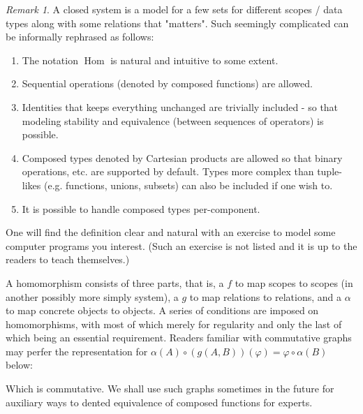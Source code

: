 \documentclass{book}
\theoremstyle{definition}\newtheorem{mechanism}{Mechanism}
\theoremstyle{remark}\newtheorem*{remark}{Remark}
\DeclareMathOperator*{\Hom}{Hom}
\begin{document}
\begin{remark}
	A closed system is a model for a few sets for different scopes / data types along with some relations that "matters". Such seemingly complicated can be informally rephrased as follows:
	
	\begin{enumerate}
		\item The notation $\Hom$ is natural and intuitive to some extent.
		\item Sequential operations (denoted by composed functions) are allowed.
		\item Identities that keeps everything unchanged are trivially included - so that modeling stability and equivalence (between sequences of operators) is possible.
		\item Composed types denoted by Cartesian products are allowed so that binary operations, etc. are supported by default. Types more complex than tuple-likes (e.g. functions, unions, subsets) can also be included if one wish to.
		\item It is possible to handle composed types per-component.
	\end{enumerate}
	
	One will find the definition clear and natural with an exercise to model some computer programs you interest. (Such an exercise is not listed and it is up to the readers to teach themselves.)
	
	A homomorphism consists of three parts, that is, a $f$ to map scopes to scopes (in another possibly more simply system), a $g$ to map relations to relations, and a $\alpha$ to map concrete objects to objects. A series of conditions are imposed on homomorphisms, with most of which merely for regularity and only the last of which being an essential requirement. Readers familiar with commutative graphs may perfer the representation for $\alpha(A)\circ (g(A, B))(\varphi) = \varphi\circ \alpha(B)$ below:
	
	\begin{center}
	\end{center}
	
	Which is commutative. We shall use such graphs sometimes in the future for auxiliary ways to dented equivalence of composed functions for experts.
\end{remark}
\end{document}
